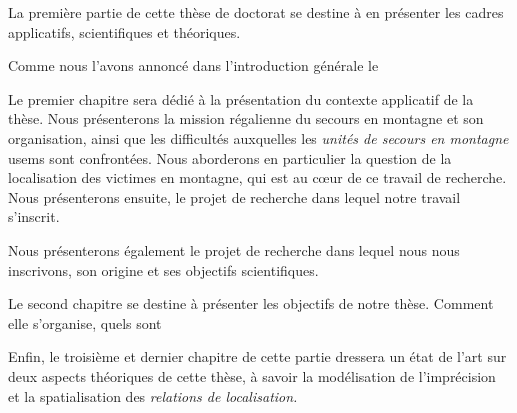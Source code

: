 La première partie de cette thèse de doctorat se destine à en
présenter les cadres applicatifs, scientifiques et théoriques.

Comme nous l'avons annoncé dans l'introduction générale le 

% 

Le premier chapitre sera dédié à la présentation du contexte
applicatif de la thèse. Nous présenterons la mission régalienne du
secours en montagne et son organisation, ainsi que les difficultés
auxquelles les \emph{unités de secours en montagne} \acp{usem} sont
confrontées. Nous aborderons en particulier la question de la
localisation des victimes en montagne, qui est au cœur de ce travail
de recherche. Nous présenterons ensuite, le projet de recherche dans
lequel notre travail s'inscrit.

Nous présenterons également le projet de recherche dans lequel nous
nous inscrivons, son origine et ses objectifs scientifiques.

Le second chapitre se destine à présenter les objectifs de notre
thèse. Comment elle s'organise, quels sont

Enfin, le troisième et dernier chapitre de cette partie dressera un
état de l'art sur deux aspects théoriques de cette thèse, à savoir la
modélisation de l'imprécision et la spatialisation des \emph{relations
  de localisation.}

